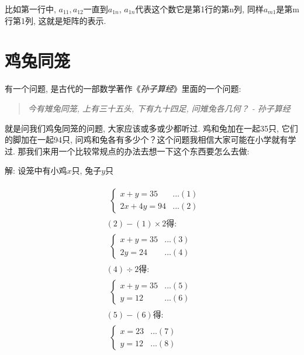 比如第一行中, $a_{11}, a_{12}$一直到$a_{1n}$, $a_{1n}$代表这个数它是第1行的第n列, 同样$a_{m1}$是第m行第1列, 这就是矩阵的表示. 

\section{鸡兔同笼}

有一个问题, 是古代的一部数学著作《\textit{孙子算经}》里面的一个问题:

\begin{quotation}
  \textit{今有雉兔同笼, 上有三十五头, 下有九十四足, 问雉兔各几何？ - 孙子算经}
\end{quotation}

就是问我们鸡兔同笼的问题, 大家应该或多或少都听过. 鸡和兔加在一起35只, 它们的脚加在一起94只, 问鸡和兔各有多少个？这个问题我相信大家可能在小学就有学过. 那我们来用一个比较常规点的办法去想一下这个东西要怎么去做:

解: 设笼中有小鸡$x$只, 兔子$y$只

\begin{align*}
  & \begin{split} \begin{cases} x + y = 35 & ...(1) \\ 2x + 4y = 94 & ...(2) \end{cases}  \end{split} \\
  & (2)-(1)\times 2\mbox{得:}\\
  & \begin{split} \begin{cases} x+y=35 & ...(3) \\ 2y=24  & ...(4) \end{cases} \end{split} \\
	& (4)\div 2 \mbox{得:} \\
	& \begin{split} \begin{cases} x+y=35 & ...(5) \\ y=12 & ...(6) \end{cases} \end{split} \\
	& (5)-(6) \mbox{得:} \\
	& \begin{split} \begin{cases} x=23 & ...(7) \\ y=12 & ...(8) \end{cases} \end{split}
\end{align*}

